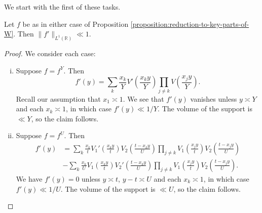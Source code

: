 \documentclass[reqno]{amsart} 
\begin{document}
We start with the first of these tasks.
\begin{lemma}\label{lemma:estimate-L1-norm-f-prime}
  Let $f$ be as in either case of Proposition \ref{proposition:reduction-to-key-parts-of-W}.  Then $\lVert f ' \rVert_{L^1(\mathbb{R})} \ll 1$.
\end{lemma}
\begin{proof}
  We consider each case:
  \begin{enumerate}[(i)]
  \item Suppose $f = f^Y$.  Then
    \begin{equation*}
      f '(y) = \sum_{k} \frac{x_k}{Y} V' \left( \frac{x _k y}{Y} \right) \prod_{j \neq k} V \left( \frac{x _j y}{Y} \right).
    \end{equation*}
    Recall our assumption that $x_1 \asymp 1$.  We see that $f'(y)$ vanishes unless $y \asymp Y$ and each $x_k \asymp 1$, in which case $f'(y) \ll 1/Y$.  The volume of the support is $\ll Y$, so the claim follows.
  \item Suppose $f = f^U$.  Then
    \begin{align*}
      f ' (y) &=
                \sum_{k} \frac{x_k}{t} V_1' \left( \frac{x _k y}{t} \right) V_2 \left( \frac{t - x _k y}{U } \right)
                \prod_{j \neq k} V _1 \left( \frac{x _j y}{t} \right) V _2 \left( \frac{t - x _j y }{U} \right) \\
              &-
                \sum_{k} \frac{x_k}{U} V_1 \left( \frac{x _k y}{t} \right) V_2' \left( \frac{t - x _k y}{U } \right)
                \prod_{j \neq k} V _1 \left( \frac{x _j y}{t} \right) V _2 \left( \frac{t - x _j y }{U} \right).
    \end{align*}
    We have $f'(y) = 0$ unless $y \asymp t$, $y - t \asymp U$ and each $x_k \asymp 1$, in which case $f'(y) \ll 1/U$.  The volume of the support is $\ll U$, so the claim follows.
  \end{enumerate}
\end{proof}
\end{document}
